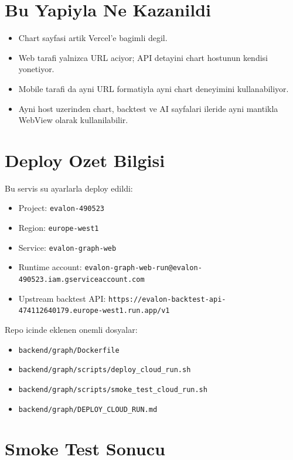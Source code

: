 \documentclass[11pt,a4paper]{article}
\begin{document}
\section{Bu Yapiyla Ne Kazanildi}

\begin{itemize}
  \item Chart sayfasi artik Vercel'e bagimli degil.
  \item Web tarafi yalnizca URL aciyor; API detayini chart hostunun kendisi yonetiyor.
  \item Mobile tarafi da ayni URL formatiyla ayni chart deneyimini kullanabiliyor.
  \item Ayni host uzerinden chart, backtest ve AI sayfalari ileride ayni mantikla WebView olarak kullanilabilir.
\end{itemize}

\section{Deploy Ozet Bilgisi}

Bu servis su ayarlarla deploy edildi:

\begin{itemize}
  \item Project: \texttt{evalon-490523}
  \item Region: \texttt{europe-west1}
  \item Service: \texttt{evalon-graph-web}
  \item Runtime account: \texttt{evalon-graph-web-run@evalon-490523.iam.gserviceaccount.com}
  \item Upstream backtest API: \texttt{https://evalon-backtest-api-474112640179.europe-west1.run.app/v1}
\end{itemize}

Repo icinde eklenen onemli dosyalar:

\begin{itemize}
  \item \texttt{backend/graph/Dockerfile}
  \item \texttt{backend/graph/scripts/deploy\_cloud\_run.sh}
  \item \texttt{backend/graph/scripts/smoke\_test\_cloud\_run.sh}
  \item \texttt{backend/graph/DEPLOY\_CLOUD\_RUN.md}
\end{itemize}

\section{Smoke Test Sonucu}
\end{document}
